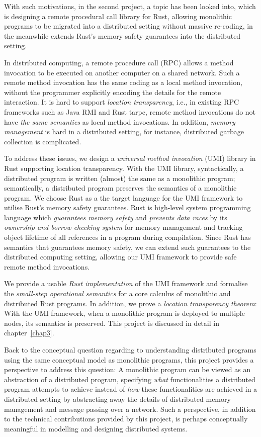 With such motivations, in the second project, a topic has been looked into, which is designing a remote procedural call library for Rust, allowing monolithic programs to be migrated into a distributed setting without massive re-coding, in the meanwhile extends Rust's memory safety guarantees into the distributed setting.

In distributed computing, a remote procedure call (RPC) allows a method invocation to be executed on another computer on a shared network. Such a remote method invocation has the same coding as a local method invocation, without the programmer explicitly encoding the details for the remote interaction. It is hard to support \emph{location transparency}, i.e., in existing RPC frameworks such as Java RMI and Rust tarpc, remote method invocations do not have \emph{the same semantics} as local method invocations. In addition, \emph{memory management} is hard in a distributed setting, for instance, distributed garbage collection is complicated.

To address these issues, we design a \emph{universal method invocation} (UMI) library in Rust supporting location transparency. With the UMI library, syntactically, a distributed program is written (almost) the same as a monolithic program; semantically, a distributed program preserves the semantics of a monolithic program. We choose Rust as a the target language for the UMI framework to utilise Rust's memory safety guarantees. Rust is high-level system programming language which \emph{guarantees memory safety} and \emph{prevents data races} by its \emph{ownership and borrow checking system} for memory management and tracking object lifetime of all references in a program during compilation. Since Rust has semantics that guarantees memory safety, we can extend such guarantees to the distributed computing setting, allowing our UMI framework to provide safe remote method invocations.

We provide a usable \emph{Rust implementation} of the UMI framework and formalise the \emph{small-step operational semantics} for a core calculus of monolithic and distributed Rust programs. In addition, we prove a \emph{location transparency theorem}: With the UMI framework, when a monolithic program is deployed to multiple nodes, its semantics is preserved.
This project is discussed in detail in chapter~\ref{chap3}.

Back to the conceptual question regarding to understanding distributed programs using the same conceptual model as monolithic programs, this project provides a perspective to address this question: A monolithic program can be viewed as an abstraction of a distributed program, specifying \emph{what} functionalities a distributed program attempts to achieve instead of \emph{how} these functionalities are achieved in a distributed setting by abstracting away the details of distributed memory management and message passing over a network. Such a perspective, in addition to the technical contributions provided by this project, is perhaps conceptually meaningful in modelling and designing distributed systems.

